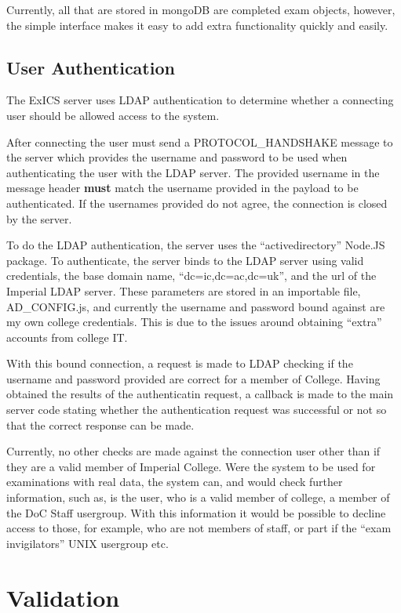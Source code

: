 Currently, all that are stored in mongoDB are completed exam objects, however, the simple interface makes it easy to add extra functionality quickly and easily.

\FloatBarrier

\subsection{User Authentication}
\label{subs:exics_auth}

The ExICS server uses LDAP authentication to determine whether a connecting user should be allowed access to the system.

After connecting the user must send a PROTOCOL\_HANDSHAKE message to the server which provides the username and password to be used when authenticating the user with the LDAP server.  The provided username in the message header \textbf{must} match the username provided in the payload to be authenticated.  If the usernames provided do not agree, the connection is closed by the server.

To do the LDAP authentication, the server uses the ``activedirectory'' Node.JS package\cite{activedirectory}.  To authenticate, the server binds to the LDAP server using valid credentials, the base domain name, ``dc=ic,dc=ac,dc=uk'', and the url of the Imperial LDAP server.  These parameters are stored in an importable file, AD\_CONFIG.js, and currently the username and password bound against are my own college credentials.  This is due to the issues around obtaining ``extra'' accounts from college IT.

With this bound connection, a request is made to LDAP checking if the username and password provided are correct for a member of College.  Having obtained the results of the authenticatin request, a callback is made to the main server code stating whether the authentication request was successful or not so that the correct response can be made.

Currently, no other checks are made against the connection user other than if they are a valid member of Imperial College.  Were the system to be used for examinations with real data, the system can, and would check further information, such as, is the user, who is a valid member of college, a member of the DoC Staff usergroup.  With this information it would be possible to decline access to those, for example, who are not members of staff, or part if the ``exam invigilators'' UNIX usergroup etc.

\section{Validation}

